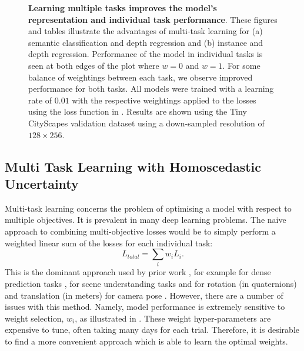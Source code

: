 {\begin{landscape}
\begin{figure}[t]
   \caption[Effect of loss weighting in multi-task learning.]{\textbf{Learning multiple tasks improves the model's representation and individual task performance}. These figures and tables illustrate the advantages of multi-task learning for (a) semantic classification and depth regression and (b) instance and depth regression. Performance of the model in individual tasks is seen at both edges of the plot where $w=0$ and $w=1$. For some balance of weightings between each task, we observe improved performance for both tasks. All models were trained with a learning rate of $0.01$ with the respective weightings applied to the losses using the loss function in . Results are shown using the Tiny CityScapes validation dataset using a down-sampled resolution of $128\times256$.}
\label{fig:scale_factor}
\end{figure}
\end{landscape}
\clearpage%
}


\subsection{Multi Task Learning with Homoscedastic Uncertainty}
\label{sec:multitask}

Multi-task learning concerns the problem of optimising a model with respect to multiple objectives. It is prevalent in many deep learning problems. The naive approach to combining multi-objective losses would be to simply perform a weighted linear sum of the losses for each individual task:
\begin{equation}
\label{eqn:basic_loss}
L_{total}= \sum_i w_i L_{i}.
\end{equation}
This is the dominant approach used by prior work \cite{teichmann2016multinet,sermanet2013overfeat,liao2016understand,uhrig2016pixel}, for example for dense prediction tasks \cite{kokkinos2016ubernet}, for scene understanding tasks \cite{eigen2015predicting} and for rotation (in quaternions) and translation (in meters) for camera pose \cite{kendall2015posenet}. However, there are a number of issues with this method. Namely, model performance is extremely sensitive to weight selection, $w_i$, as illustrated in . These weight hyper-parameters are expensive to tune, often taking many days for each trial. Therefore, it is desirable to find a more convenient approach which is able to learn the optimal weights.

